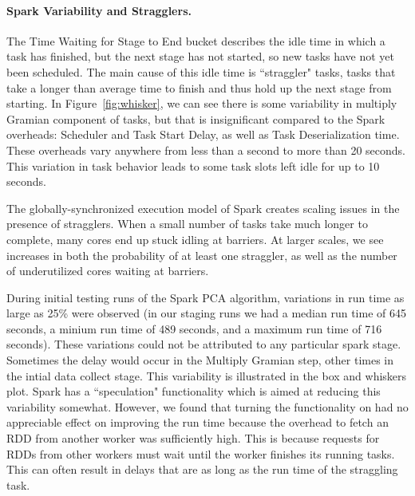 \paragraph{Spark Variability and Stragglers.}
The Time Waiting for Stage to End bucket describes the idle time in which a task has finished, but the next stage has not started, so new tasks have not yet been scheduled. The main cause of this idle time is ``straggler" tasks, tasks that take a longer than average time to finish and thus hold up the next stage from starting. In Figure~\ref{fig:whisker}, we can see there is some variability in multiply Gramian component of tasks, but that is insignificant compared to the Spark overheads: Scheduler and Task Start Delay, as well as Task Deserialization time. These overheads vary anywhere from less than a second to more than 20 seconds. This variation in task behavior leads to some task slots left idle for up to 10 seconds.

The globally-synchronized execution model of Spark creates scaling issues in the presence of stragglers. When a small number of tasks take much longer to complete, many cores end up stuck idling at barriers. At larger scales, we see increases in both the probability of at least one straggler, as well as the number of underutilized cores waiting at barriers.

During initial testing runs of the Spark PCA algorithm, variations in run time as large as 25\% were observed (in our staging runs we had a median run time of 645 seconds, a minium run time of 489 seconds, and a maximum run time of 716 seconds). These variations could not be attributed to any particular spark stage. Sometimes the delay would occur in the Multiply Gramian step, other times in the intial data collect stage. This variability is illustrated in the box and whiskers plot. Spark has a ``speculation" functionality which is aimed at reducing this variability somewhat. However, we found that turning the functionality on had no appreciable effect on improving the run time because the overhead to fetch an RDD from another worker was sufficiently high. This is because requests for RDDs from other workers must wait until the worker finishes its running tasks. This can often result in delays that are as long as the run time of the straggling task.  

